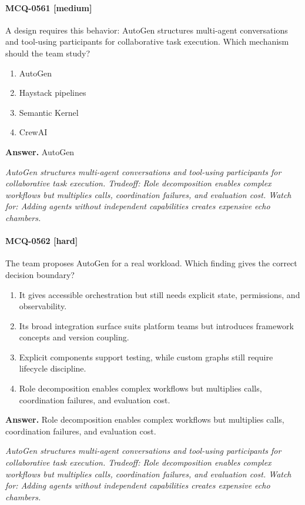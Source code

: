 \paragraph{MCQ-0561 [medium]} A design requires this behavior: AutoGen structures multi-agent conversations and tool-using participants for collaborative task execution. Which mechanism should the team study?
\begin{enumerate}[label=\Alph*.]
\item AutoGen
\item Haystack pipelines
\item Semantic Kernel
\item CrewAI
\end{enumerate}
\noindent\textbf{Answer.} AutoGen
\par\textit{AutoGen structures multi-agent conversations and tool-using participants for collaborative task execution. Tradeoff: Role decomposition enables complex workflows but multiplies calls, coordination failures, and evaluation cost. Watch for: Adding agents without independent capabilities creates expensive echo chambers.}
\paragraph{MCQ-0562 [hard]} The team proposes AutoGen for a real workload. Which finding gives the correct decision boundary?
\begin{enumerate}[label=\Alph*.]
\item It gives accessible orchestration but still needs explicit state, permissions, and observability.
\item Its broad integration surface suits platform teams but introduces framework concepts and version coupling.
\item Explicit components support testing, while custom graphs still require lifecycle discipline.
\item Role decomposition enables complex workflows but multiplies calls, coordination failures, and evaluation cost.
\end{enumerate}
\noindent\textbf{Answer.} Role decomposition enables complex workflows but multiplies calls, coordination failures, and evaluation cost.
\par\textit{AutoGen structures multi-agent conversations and tool-using participants for collaborative task execution. Tradeoff: Role decomposition enables complex workflows but multiplies calls, coordination failures, and evaluation cost. Watch for: Adding agents without independent capabilities creates expensive echo chambers.}
